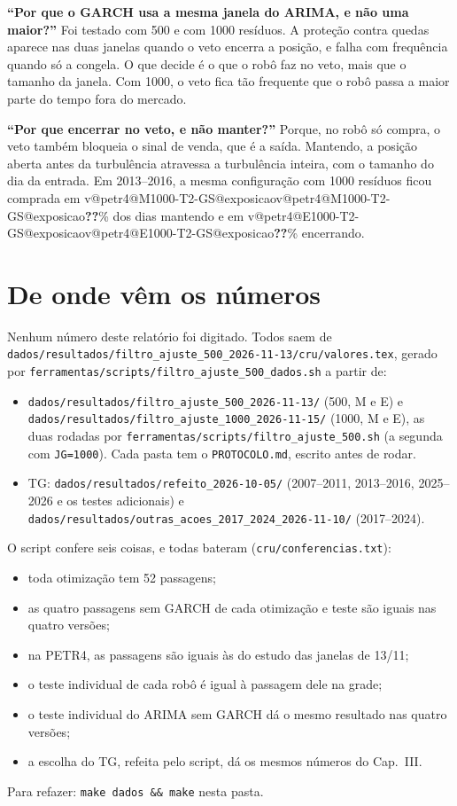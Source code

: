 \documentclass[11pt,a4paper]{article}
\makeatletter
\newcommand{\V}[3]{\ifcsname v@#1@#2@#3\endcsname\csname v@#1@#2@#3\endcsname\else\textbf{\color{red}??}\fi}
\makeatother
\begin{document}
\begin{banca}
\textbf{``Por que o GARCH usa a mesma janela do ARIMA, e não uma maior?''} Foi testado com 500 e com 1000
resíduos. A proteção contra quedas aparece nas duas janelas quando o veto encerra a posição, e falha com
frequência quando só a congela. O que decide é o que o robô faz no veto, mais que o tamanho da janela. Com 1000,
o veto fica tão frequente que o robô passa a maior parte do tempo fora do mercado.

\textbf{``Por que encerrar no veto, e não manter?''} Porque, no robô só compra, o veto também bloqueia o sinal de
venda, que é a saída. Mantendo, a posição aberta antes da turbulência atravessa a turbulência inteira, com o
tamanho do dia da entrada. Em 2013--2016, a mesma configuração com 1000 resíduos ficou comprada em
\V{petr4}{M1000-T2-GS}{exposicao}\% dos dias mantendo e em \V{petr4}{E1000-T2-GS}{exposicao}\% encerrando.
\end{banca}

\section*{De onde vêm os números}

Nenhum número deste relatório foi digitado. Todos saem de
\nolinkurl{dados/resultados/filtro_ajuste_500_2026-11-13/cru/valores.tex}, gerado por
\nolinkurl{ferramentas/scripts/filtro_ajuste_500_dados.sh} a partir de:
\begin{itemize}\setlength{\itemsep}{1pt}
\item \nolinkurl{dados/resultados/filtro_ajuste_500_2026-11-13/} (500, M e E) e
  \nolinkurl{dados/resultados/filtro_ajuste_1000_2026-11-15/} (1000, M e E), as duas rodadas por
  \nolinkurl{ferramentas/scripts/filtro_ajuste_500.sh} (a segunda com \texttt{JG=1000}). Cada pasta tem o
  \texttt{PROTOCOLO.md}, escrito antes de rodar.
\item TG: \nolinkurl{dados/resultados/refeito_2026-10-05/} (2007--2011, 2013--2016, 2025--2026 e os testes
  adicionais) e \nolinkurl{dados/resultados/outras_acoes_2017_2024_2026-11-10/} (2017--2024).
\end{itemize}
O script confere seis coisas, e todas bateram (\nolinkurl{cru/conferencias.txt}):
\begin{itemize}\setlength{\itemsep}{1pt}
\item toda otimização tem 52 passagens;
\item as quatro passagens sem GARCH de cada otimização e teste são iguais nas quatro versões;
\item na PETR4, as passagens são iguais às do estudo das janelas de 13/11;
\item o teste individual de cada robô é igual à passagem dele na grade;
\item o teste individual do ARIMA sem GARCH dá o mesmo resultado nas quatro versões;
\item a escolha do TG, refeita pelo script, dá os mesmos números do Cap.~III.
\end{itemize}
Para refazer: \texttt{make dados \&\& make} nesta pasta.
\end{document}
